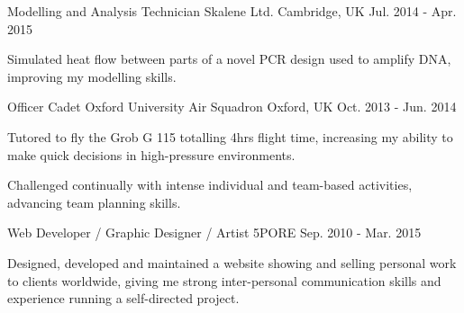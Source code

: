 \begin{cventries}
{\begin{cvitems}
      \end{cvitems}
    }
  \cventry
    {Modelling and Analysis Technician}
    {Skalene Ltd.}
    {Cambridge, UK}
    {Jul. 2014 - Apr. 2015}
    {
      \begin{cvitems}
        \item {Simulated heat flow between parts of a novel PCR design used to amplify DNA, improving my modelling skills.}
      \end{cvitems}
    }
  \cventry
    {Officer Cadet}
    {Oxford University Air Squadron}
    {Oxford, UK}
    {Oct. 2013 - Jun. 2014}
    {
      \begin{cvitems}
        \item {Tutored to fly the Grob G 115 totalling 4hrs flight time, increasing my ability to make quick decisions in high-pressure environments.}
        \item {Challenged continually with intense individual and team-based activities, advancing team planning skills.}
      \end{cvitems} 
    }
  \cventry
    {Web Developer / Graphic Designer / Artist}
    {5PORE}
    {}
    {Sep. 2010 - Mar. 2015}
    {
      \begin{cvitems}
        \item {Designed, developed and maintained a website showing and selling personal work to clients worldwide, giving me strong inter-personal communication skills and experience running a self-directed project.}
      \end{cvitems}
    }
\end{cventries}

